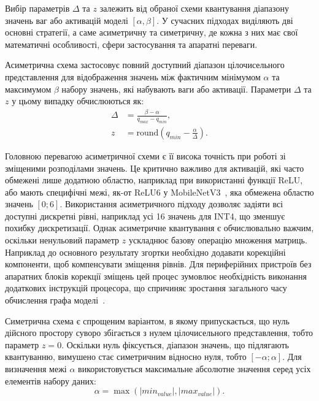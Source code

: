 \documentclass{pma-mthesis}
\begin{document}
Вибір параметрів $\Delta$ та $z$ залежить від обраної схеми квантування діапазону значень ваг або активацій моделі $[\alpha, \beta]$. У сучасних підходах виділяють дві основні стратегії, а саме асиметричну та симетричну, де кожна з них має свої математичні особливості, сфери застосування та апаратні переваги. 

Асиметрична схема застосовує повний доступний діапазон цілочисельного представлення для відображення значень між фактичним мінімумом $\alpha$ та максимумом $\beta$ набору значень, які набувають ваги або активації. Параметри $\Delta$ та $z$ у цьому випадку обчислюються як:
\begin{equation}
    \begin{split}
    \Delta &= \frac{\beta - \alpha}{q_{max} - q_{min}}, \\ z &= \text{round}\left(q_{min} - \frac{\alpha}{\Delta}\right).
    \end{split}
\end{equation}

Головною перевагою асиметричної схеми є її висока точність при роботі зі зміщеними розподілами значень. Це критично важливо для активацій, які часто обмежені лише додатною областю, наприклад при використанні функції ReLU, або мають специфічні межі, як-от ReLU6 у MobileNetV3~\cite{howard2019searching}, яка обмежена областю значень $[0; 6]$. Використання асиметричного підходу дозволяє задіяти всі доступні дискретні рівні, наприклад усі 16 значень для INT4, що зменшує похибку дискретизації. Однак асиметричне квантування є обчислювально важчим, оскільки ненульовий параметр $z$ ускладнює базову операцію множення матриць. Наприклад до основного результату згортки необхідно додавати корекційні компоненти, щоб компенсувати зміщення рівнів. Для периферійних пристроїв без апаратних блоків корекції зміщень цей процес зумовлює необхідність виконання додаткових інструкцій процесора, що спричиняє зростання загального часу обчислення графа моделі~\cite{nagel2021white}.

Симетрична схема є спрощеним варіантом, в якому припускається, що нуль дійсного простору суворо збігається з нулем цілочисельного представлення, тобто параметр $z = 0$. Оскільки нуль фіксується, діапазон значень, що підлягають квантуванню, вимушено стає симетричним відносно нуля, тобто $[-\alpha; \alpha]$. Для визначення межі $\alpha$ використовується максимальне абсолютне значення серед усіх елементів набору даних:
\begin{equation}
    \alpha = \max(|min_{value}|, |max_{value}|).
\end{equation}
\end{document}

